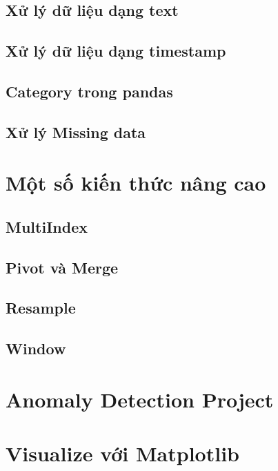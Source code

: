 \documentclass[
]{book}
\begin{document}
\hypertarget{xux1eed-luxfd-dux1eef-liux1ec7u-dux1ea1ng-text}{%
\section{Xử lý dữ liệu dạng text}\label{xux1eed-luxfd-dux1eef-liux1ec7u-dux1ea1ng-text}}

\hypertarget{xux1eed-luxfd-dux1eef-liux1ec7u-dux1ea1ng-timestamp}{%
\section{Xử lý dữ liệu dạng timestamp}\label{xux1eed-luxfd-dux1eef-liux1ec7u-dux1ea1ng-timestamp}}

\hypertarget{category-trong-pandas}{%
\section{Category trong pandas}\label{category-trong-pandas}}

\hypertarget{xux1eed-luxfd-missing-data}{%
\section{Xử lý Missing data}\label{xux1eed-luxfd-missing-data}}

\hypertarget{mux1ed9t-sux1ed1-kiux1ebfn-thux1ee9c-nuxe2ng-cao}{%
\chapter{Một số kiến thức nâng cao}\label{mux1ed9t-sux1ed1-kiux1ebfn-thux1ee9c-nuxe2ng-cao}}

\hypertarget{multiindex}{%
\section{MultiIndex}\label{multiindex}}

\hypertarget{pivot-vuxe0-merge}{%
\section{Pivot và Merge}\label{pivot-vuxe0-merge}}

\hypertarget{resample}{%
\section{Resample}\label{resample}}

\hypertarget{window}{%
\section{Window}\label{window}}

\hypertarget{anomaly-detection-project}{%
\chapter{Anomaly Detection Project}\label{anomaly-detection-project}}

\hypertarget{visualize-vux1edbi-matplotlib}{%
\chapter{Visualize với Matplotlib}\label{visualize-vux1edbi-matplotlib}}

  
\end{document}
